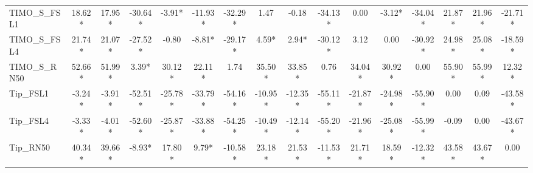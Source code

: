 \documentclass[conference,6pt]{IEEEtran}
\begin{document}
\begin{table}[H]
{\begin{tabular}{@{}l*{15}{c}@{}}
TIMO\_S\_FSL1 & 18.62* & 17.95* & -30.64* & -3.91* & -11.93* & -32.29* & 1.47 & -0.18 & -34.13* & 0.00 & -3.12* & -34.04* & 21.87* & 21.96* & -21.71* \\
TIMO\_S\_FSL4 & 21.74* & 21.07* & -27.52* & -0.80 & -8.81* & -29.17* & 4.59* & 2.94* & -30.12* & 3.12 & 0.00 & -30.92* & 24.98* & 25.08* & -18.59* \\
TIMO\_S\_RN50 & 52.66* & 51.99* & 3.39* & 30.12* & 22.11* & 1.74 & 35.50* & 33.85* & 0.76 & 34.04* & 30.92* & 0.00 & 55.90* & 55.99* & 12.32* \\
Tip\_FSL1 & -3.24* & -3.91* & -52.51* & -25.78* & -33.79* & -54.16* & -10.95* & -12.35* & -55.11* & -21.87* & -24.98* & -55.90* & 0.00 & 0.09 & -43.58* \\
Tip\_FSL4 & -3.33* & -4.01* & -52.60* & -25.87* & -33.88* & -54.25* & -10.49* & -12.14* & -55.20* & -21.96* & -25.08* & -55.99* & -0.09 & 0.00 & -43.67* \\
Tip\_RN50 & 40.34* & 39.66* & -8.93* & 17.80* & 9.79* & -10.58* & 23.18* & 21.53* & -11.53* & 21.71* & 18.59* & -12.32* & 43.58* & 43.67* & 0.00 \\
\bottomrule
\end{tabular}%
}
\end{table}

\FloatBarrier


\clearpage
\end{document}
